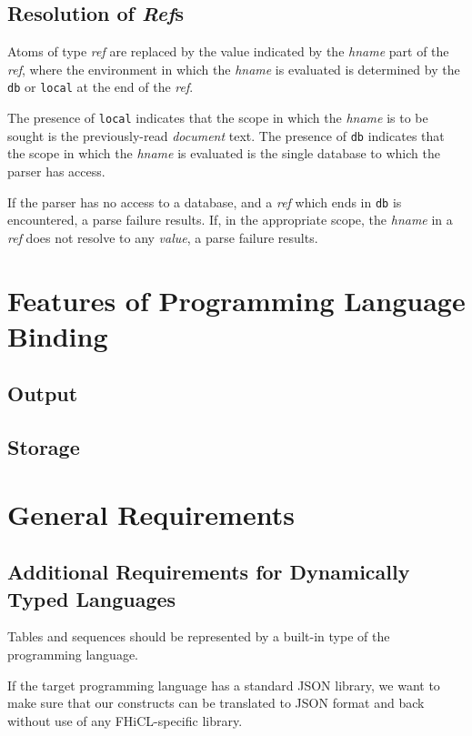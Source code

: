 \documentclass{memarticle}
\begin{document}
	\subsection{Resolution of \emph{Ref}s\label{sec:refs}}
		Atoms of type \emph{ref} are replaced
		by the value indicated by the \emph{hname} part of the \emph{ref},
		where the environment in which the \emph{hname} is evaluated is determined
		by the \texttt{db} or \texttt{local} at the end of the \emph{ref}.
		\vspace{1mm}
		\par
		The presence of \texttt{local} indicates 
		that the scope in which the \emph{hname} is to be sought
		is the previously-read \emph{document} text.
		The presence of 
		\texttt{db} indicates
		that the scope in which the \emph{hname} is evaluated
		is the single database
		to which the parser has access.
		\vspace{1mm}
		\par
		If the parser has no access to a database,
		and a \emph{ref} which ends in \texttt{db} is encountered,
		a parse failure results.
		If,
		in the appropriate scope,
		the \emph{hname} in a \emph{ref} does not resolve to any \emph{value},
		a parse failure results.
		
\section{Features of Programming Language Binding}
	\subsection{Output}
	\subsection{Storage}	
		
\section{General Requirements}
	\subsection{Additional Requirements for Dynamically Typed Languages}
		Tables and sequences should be represented by a built-in type of the
		programming language.

		If the target programming language has a standard JSON library, we
		want to make sure that our constructs can be translated to JSON format
		and back without use of any FHiCL-specific library.
\end{document}
